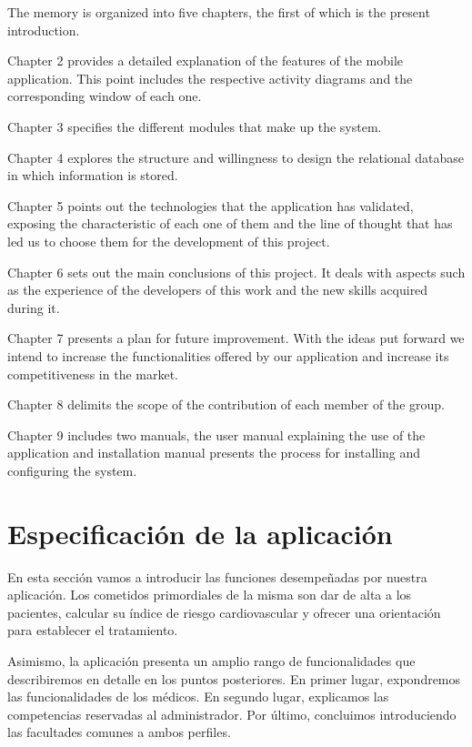 \documentclass[11pt,spanish,
		listoftables,listoffigures]
		{tfgplantilla}
\begin{document}
The memory is organized into five chapters, the first of which is the present introduction.

Chapter 2 provides a detailed explanation of the features of the mobile application. This point includes the respective activity diagrams and the corresponding window of each one.

Chapter 3 specifies the different modules that make up the system.

Chapter 4 explores the structure and willingness to design the relational database in which information is stored.

Chapter 5 points out the technologies that the application has validated, exposing the characteristic of each one of them and the line of thought that has led us to choose them for the development of this project.

Chapter 6 sets out the main conclusions of this project. It deals with aspects such as the experience of the developers of this work and the new skills acquired during it.

Chapter 7 presents a plan for future improvement. With the ideas put forward we intend to increase the functionalities offered by our application and increase its competitiveness in the market.

Chapter 8 delimits the scope of the contribution of each member of the group.

Chapter 9 includes two manuals, the user manual explaining the use of the application and installation manual presents the process for installing and configuring the system.


\chapter{Especificación de la aplicaci\'on}

En esta sección vamos a introducir las funciones desempeñadas por nuestra aplicación. Los cometidos primordiales de la misma son dar de alta a los pacientes, calcular su índice de riesgo cardiovascular y ofrecer una orientación para establecer el tratamiento.

Asimismo, la aplicación presenta un amplio rango de funcionalidades que describiremos en detalle en los puntos posteriores. En primer lugar, expondremos las funcionalidades de los médicos. En segundo lugar, explicamos las competencias reservadas al administrador. 
Por último, concluimos introduciendo las facultades comunes a ambos perfiles.
\end{document}
